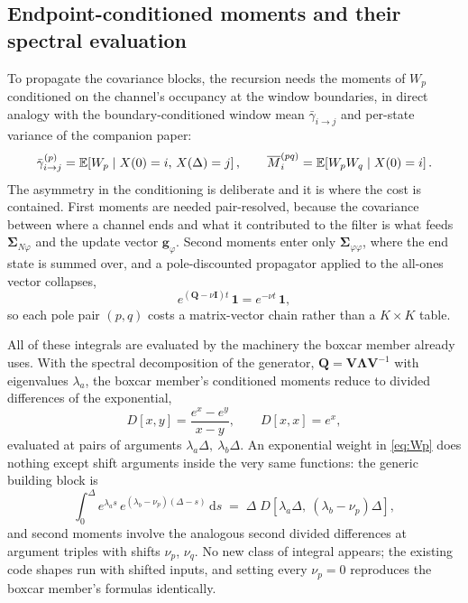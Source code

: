 \documentclass[11pt]{article}
\begin{document}
\subsection{Endpoint-conditioned moments and their spectral evaluation}

To propagate the covariance blocks, the recursion needs the moments of
$W_p$ conditioned on the channel's occupancy at the window boundaries, in
direct analogy with the boundary-conditioned window mean
$\bar{\gamma}_{i\to j}$ and per-state variance of the companion paper:
\begin{equation}
  \bar{\gamma}^{(p)}_{i\to j}
  = \mathbb{E}\!\left[ W_p \mid X(0)=i,\, X(\Delta)=j \right],
  \qquad
  \overline{M}^{(pq)}_{i}
  = \mathbb{E}\!\left[ W_p W_q \mid X(0)=i \right].
  \label{eq:cond-moments}
\end{equation}
The asymmetry in the conditioning is deliberate and it is where the cost
is contained. First moments are needed pair-resolved, because the
covariance between where a channel ends and what it contributed to the
filter is what feeds $\bm{\Sigma}_{\!N\varphi}$ and the update vector
$\mathbf{g}_{\varphi}$. Second moments enter only
$\bm{\Sigma}_{\!\varphi\varphi}$, where the end state is summed over, and
a pole-discounted propagator applied to the all-ones vector collapses,
\begin{equation}
  e^{(\mathbf{Q}-\nu\mathbf{I})t}\,\mathbf{1} = e^{-\nu t}\,\mathbf{1},
  \label{eq:collapse}
\end{equation}
so each pole pair $(p,q)$ costs a matrix-vector chain rather than a
$K\times K$ table.

All of these integrals are evaluated by the machinery the boxcar member
already uses. With the spectral decomposition of the generator,
$\mathbf{Q} = \mathbf{V}\bm{\Lambda}\mathbf{V}^{-1}$ with eigenvalues
$\lambda_a$, the boxcar member's conditioned moments reduce to divided
differences of the exponential,
\begin{equation}
  D[x,y] = \frac{e^{x} - e^{y}}{x-y},
  \qquad D[x,x] = e^{x},
  \label{eq:divdiff}
\end{equation}
evaluated at pairs of arguments $\lambda_a\Delta,\ \lambda_b\Delta$. An
exponential weight in \eqref{eq:Wp} does nothing except shift arguments
inside the very same functions: the generic building block is
\begin{equation}
  \int_0^{\Delta} e^{\lambda_a s}\,
  e^{(\lambda_b-\nu_p)(\Delta-s)}\,\mathrm{d}s
  \;=\;
  \Delta\; D\!\left[\lambda_a\Delta,\ (\lambda_b-\nu_p)\Delta\right],
  \label{eq:shifted}
\end{equation}
and second moments involve the analogous second divided differences at
argument triples with shifts $\nu_p$, $\nu_q$. No new class of integral
appears; the existing code shapes run with shifted inputs, and setting
every $\nu_p = 0$ reproduces the boxcar member's formulas identically.
\end{document}
